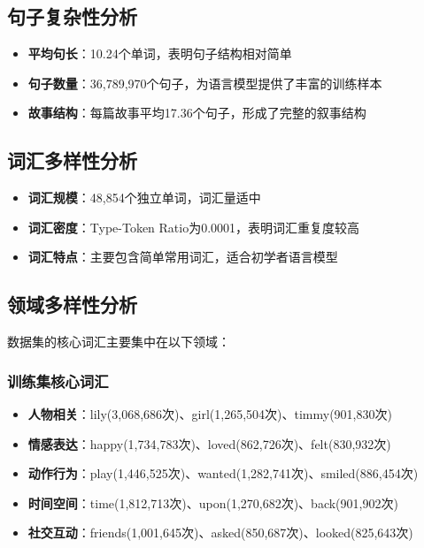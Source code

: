 \documentclass{article}
\begin{document}
\subsection{句子复杂性分析}
\begin{itemize}
    \item \textbf{平均句长}：10.24个单词，表明句子结构相对简单
    \item \textbf{句子数量}：36,789,970个句子，为语言模型提供了丰富的训练样本
    \item \textbf{故事结构}：每篇故事平均17.36个句子，形成了完整的叙事结构
\end{itemize}

\subsection{词汇多样性分析}
\begin{itemize}
    \item \textbf{词汇规模}：48,854个独立单词，词汇量适中
    \item \textbf{词汇密度}：Type-Token Ratio为0.0001，表明词汇重复度较高
    \item \textbf{词汇特点}：主要包含简单常用词汇，适合初学者语言模型
\end{itemize}

\subsection{领域多样性分析}
数据集的核心词汇主要集中在以下领域：

\subsubsection{训练集核心词汇}
\begin{itemize}
    \item \textbf{人物相关}：lily(3,068,686次)、girl(1,265,504次)、timmy(901,830次)
    \item \textbf{情感表达}：happy(1,734,783次)、loved(862,726次)、felt(830,932次)
    \item \textbf{动作行为}：play(1,446,525次)、wanted(1,282,741次)、smiled(886,454次)
    \item \textbf{时间空间}：time(1,812,713次)、upon(1,270,682次)、back(901,902次)
    \item \textbf{社交互动}：friends(1,001,645次)、asked(850,687次)、looked(825,643次)
\end{itemize}
\end{document}
